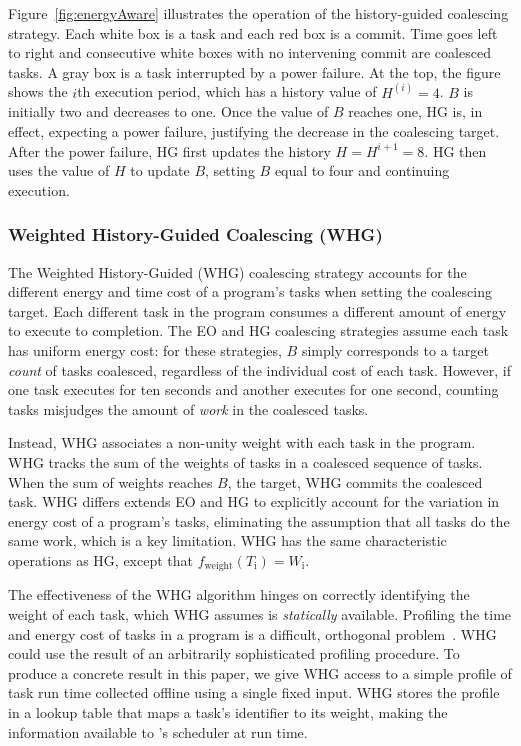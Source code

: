 Figure~\ref{fig:energyAware} illustrates the operation of the history-guided
coalescing strategy.  Each white box is a task and each red box is a commit.
Time goes left to right and consecutive white boxes with no intervening commit
are coalesced tasks.  A gray box is a task interrupted by a power failure.  At
the top, the figure shows the $i$th execution period, which has a history
value of $H^{(i)} = 4$.  $B$ is initially two and decreases to one.  Once the
value of $B$ reaches one, HG is, in effect, expecting a power failure,
justifying the decrease in the coalescing target.  After the power failure, HG
first updates the history $H = H^{i+1} = 8$. HG then uses the value of $H$ to
update $B$, setting $B$ equal to four and continuing execution.  


\subsubsection{Weighted History-Guided Coalescing (WHG)}
\label{subsec:energyTaskAware}

The Weighted History-Guided (WHG) coalescing strategy accounts for the
different energy and time cost of a program's tasks when setting the coalescing
target.
%
Each different task in the program consumes a different amount of energy to
execute to completion.  
%
The EO and HG coalescing strategies assume each task has uniform energy cost:
for these strategies, $B$ simply corresponds to a target {\em count} of tasks
coalesced, regardless of the individual cost of each task.
%
However, if one task executes for ten seconds and another executes for one
second, counting tasks misjudges the amount of {\em work} in the coalesced
tasks.

Instead, WHG associates a non-unity weight with each task in the program. 
%
WHG tracks the sum of the weights of tasks in a coalesced sequence of tasks.
%
When the sum of weights reaches $B$, the target, WHG commits the coalesced
task.
%
WHG differs extends EO and HG to explicitly account for the variation in energy
cost of a program's tasks, eliminating the assumption that all tasks do the
same work, which is a key limitation.
%
WHG has the same characteristic operations as HG, except that
$f_\text{weight}(T_\text{i}) = W_\text{i}$.

The effectiveness of the WHG algorithm hinges on correctly identifying the
weight of each task, which WHG assumes is {\em statically} available.
%
Profiling the time and energy cost of tasks in a program is a difficult,
orthogonal problem~\cite{cleancut,baghsorkhi_cgo_2018}.
%
WHG could use the result of an arbitrarily sophisticated profiling procedure.
%
To produce a concrete result in this paper, we give WHG access to a simple
profile of task run time collected offline using a single fixed input.
%
WHG stores the profile in a lookup table that maps a task's identifier to its
weight, making the information available to \sys's scheduler at run time.
